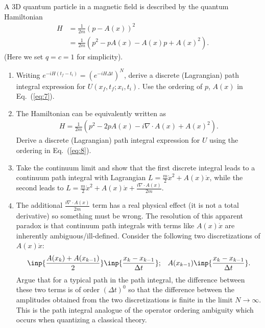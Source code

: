 \documentclass{jhwhw}
\begin{document}
A 3D quantum particle in a magnetic field is described by the quantum Hamiltonian
\begin{align}
  H & = \frac1{2m}(p - A(x))^2 \nonumber \\
 & = \frac1{2m}(p^2 - pA(x) - A(x)p +A(x)^2)\label{eq:7}.
\end{align}
(Here we set $q=c=1$ for simplicity).
\newcommand{\propx}{U(x_f,t_f;x_i,t_i)}
\newcommand{\dt}{\Delta t}
\begin{enumerate}
\item Writing $e^{-iH(t_f-t_i)} = (e^{-iH\dt})^N$, derive a discrete (Lagrangian) path integral expression for $\propx$. Use the ordering of $p$, $A(x)$ in Eq.~(\ref{eq:7}).
\item The Hamiltonian can be equivalently written as
  \begin{align}
    H = \frac1{2m}(p^2 - 2p A(x) - i \nabla \cdot A(x) + A(x)^2)\label{eq:8}.
  \end{align}
Derive a discrete (Lagrangian) path integral expression for $U$ using the ordering in Eq.~(\ref{eq:8}).
\item Take the continuum limit and show that the first discrete integral leads to a continuum path integral with Lagrangian $L= \frac m 2 \dot x^2 + A(x) \dot x$, while the second leads to $L = \frac m 2 \dot x^2 + A(x)\dot x + \frac {i \nabla \cdot A(x)}{2m}$.
\item The additional $\frac{i \nabla \cdot A(x)}{2m}$ term has a real physical effect (it is not a total derivative) so something must be wrong. The resolution of this apparent paradox is that continuum path integrals with terms like $A(x) \dot x$ are inherently ambiguous/ill-defined. Consider the following two discretizations of $A(x) \dot x$:
  \begin{align}
    \inp{\frac{A(x_k) + A(x_{k-1})}2}\inp{\frac{x_k-x_{k-1}}{\dt}}; && A(x_{k-1})\inp{\frac{x_k-x_{k-1}}{\dt}}.\label{eq:9}
  \end{align}
Argue that for a typical path in the path integral, the difference between these two terms is of order $(\dt)^0$ so that the difference between the amplitudes obtained from the two discretizations is finite in the limit $N\rightarrow\infty$. This is the path integral analogue of the operator ordering ambiguity which occurs when quantizing a classical theory.
\end{enumerate}

\end{document}
